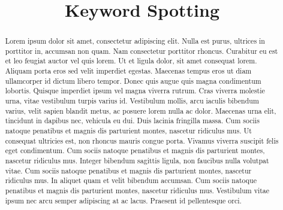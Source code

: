 \documentclass[conference]{IEEEtran}
\begin{document}
\title{Keyword Spotting}
\author{
\and
{}
}

\maketitle

\begin{abstract}
Lorem ipsum dolor sit amet, consectetur adipiscing elit. Nulla est purus, ultrices in porttitor
in, accumsan non quam. Nam consectetur porttitor rhoncus. Curabitur eu est et leo feugiat
auctor vel quis lorem. Ut et ligula dolor, sit amet consequat lorem. Aliquam porta eros sed
velit imperdiet egestas. Maecenas tempus eros ut diam ullamcorper id dictum libero
tempor. Donec quis augue quis magna condimentum lobortis. Quisque imperdiet ipsum vel
magna viverra rutrum. Cras viverra molestie urna, vitae vestibulum turpis varius id.
Vestibulum mollis, arcu iaculis bibendum varius, velit sapien blandit metus, ac posuere lorem
nulla ac dolor. Maecenas urna elit, tincidunt in dapibus nec, vehicula eu dui. Duis lacinia
fringilla massa. Cum sociis natoque penatibus et magnis dis parturient montes, nascetur
ridiculus mus. Ut consequat ultricies est, non rhoncus mauris congue porta. Vivamus viverra
suscipit felis eget condimentum. Cum sociis natoque penatibus et magnis dis parturient
montes, nascetur ridiculus mus. Integer bibendum sagittis ligula, non faucibus nulla volutpat
vitae. Cum sociis natoque penatibus et magnis dis parturient montes, nascetur ridiculus mus.  
In aliquet quam et velit bibendum accumsan. Cum sociis natoque penatibus et magnis dis
parturient montes, nascetur ridiculus mus. Vestibulum vitae ipsum nec arcu semper
adipiscing at ac lacus. Praesent id pellentesque orci.
\end{abstract}

\IEEEpeerreviewmaketitle
\end{document}
